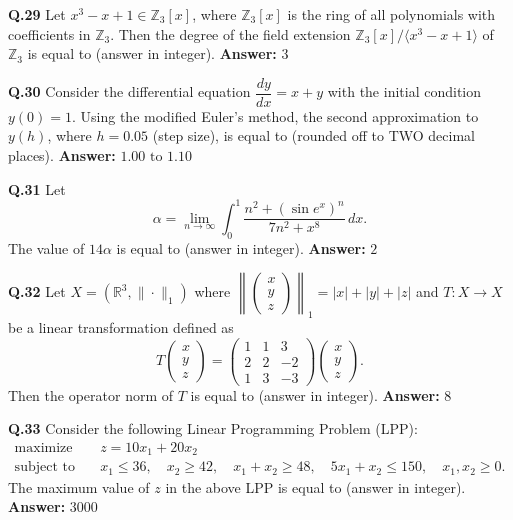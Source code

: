 \documentclass[11pt,a4paper]{article}
\newcommand{\ans}[1]{\textbf{Answer:} #1\par\medskip}
\begin{document}
\textbf{Q.29} Let $x^3 - x + 1 \in \mathbb{Z}_3[x]$, where $\mathbb{Z}_3[x]$ is the ring of all polynomials with coefficients in $\mathbb{Z}_3$. Then the degree of the field extension $\mathbb{Z}_3[x]/\langle x^3 - x + 1 \rangle$ of $\mathbb{Z}_3$ is equal to \underline{\hspace{2cm}} (answer in integer).
\ans{$3$}

\textbf{Q.30} Consider the differential equation $\dfrac{dy}{dx} = x + y$ with the initial condition $y(0) = 1$. Using the modified Euler's method, the second approximation to $y(h)$, where $h = 0.05$ (step size), is equal to \underline{\hspace{2cm}} (rounded off to TWO decimal places).
\ans{$1.00 \text{ to } 1.10$}

\textbf{Q.31} Let
\[
  \alpha = \lim_{n \to \infty} \int_0^1 \frac{n^2 + (\sin e^x)^n}{7n^2 + x^8}\,dx.
\]
The value of $14\alpha$ is equal to \underline{\hspace{2cm}} (answer in integer).
\ans{$2$}

\textbf{Q.32} Let $X = (\mathbb{R}^3, \|\cdot\|_1)$ where $\left\|\begin{pmatrix} x \\ y \\ z \end{pmatrix}\right\|_1 = |x| + |y| + |z|$ and $T : X \to X$ be a linear transformation defined as
\[
  T\begin{pmatrix} x \\ y \\ z \end{pmatrix} = \begin{pmatrix} 1 & 1 & 3 \\ 2 & 2 & -2 \\ 1 & 3 & -3 \end{pmatrix} \begin{pmatrix} x \\ y \\ z \end{pmatrix}.
\]
Then the operator norm of $T$ is equal to \underline{\hspace{2cm}} (answer in integer).
\ans{$8$}

\textbf{Q.33} Consider the following Linear Programming Problem (LPP):
\begin{align*}
  \text{maximize} \quad & z = 10x_1 + 20x_2 \\
  \text{subject to} \quad & x_1 \le 36, \quad x_2 \ge 42, \quad x_1 + x_2 \ge 48, \quad 5x_1 + x_2 \le 150, \quad x_1, x_2 \ge 0.
\end{align*}
The maximum value of $z$ in the above LPP is equal to \underline{\hspace{2cm}} (answer in integer).
\ans{$3000$}
\end{document}
